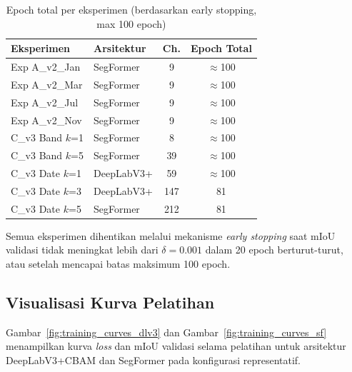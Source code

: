\begin{table}[H]
    \centering
    \caption{Epoch total per eksperimen (berdasarkan early stopping, max 100 epoch)}
    \label{tab:waktu_pelatihan}
    \begin{tabular}{|l|l|c|c|}
    \hline
    \textbf{Eksperimen} & \textbf{Arsitektur} & \textbf{Ch.} & \textbf{Epoch Total} \\
    \hline
    Exp A\_v2\_Jan  & SegFormer      & 9   & $\approx$100 \\
    Exp A\_v2\_Mar  & SegFormer      & 9   & $\approx$100 \\
    Exp A\_v2\_Jul  & SegFormer      & 9   & $\approx$100 \\
    Exp A\_v2\_Nov  & SegFormer      & 9   & $\approx$100 \\
    C\_v3 Band $k$=1 & SegFormer     & 8   & $\approx$100 \\
    C\_v3 Band $k$=5 & SegFormer     & 39  & $\approx$100 \\
    C\_v3 Date $k$=1 & DeepLabV3+    & 59  & $\approx$100 \\
    C\_v3 Date $k$=3 & DeepLabV3+    & 147 & 81 \\
    C\_v3 Date $k$=5 & SegFormer     & 212 & 81 \\
    \hline
    \end{tabular}
\end{table}

Semua eksperimen dihentikan melalui mekanisme \textit{early stopping} saat mIoU validasi
tidak meningkat lebih dari $\delta = 0.001$ dalam 20 epoch berturut-turut,
atau setelah mencapai batas maksimum 100 epoch.

\subsection{Visualisasi Kurva Pelatihan}

Gambar~\ref{fig:training_curves_dlv3} dan Gambar~\ref{fig:training_curves_sf}
menampilkan kurva \textit{loss} dan mIoU validasi selama pelatihan untuk
arsitektur DeepLabV3+CBAM dan SegFormer pada konfigurasi representatif.

